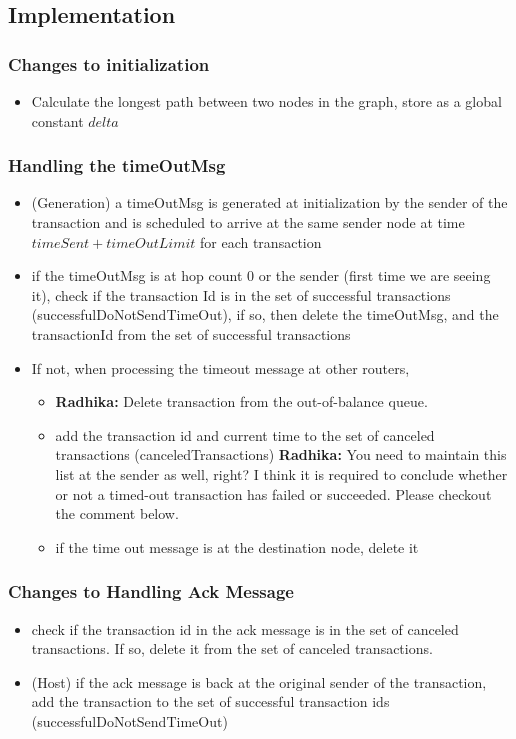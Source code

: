 \documentclass[a4paper]{article}
\newcommand{\radhika}[1]{{\color{red} \textbf{Radhika:} {#1}}}
\begin{document}
\subsection{Implementation}
\subsubsection{ Changes to initialization}
    \begin{itemize}
        \item Calculate the longest path between two nodes in the graph, store as a global constant $delta$
    \end{itemize}

\subsubsection{ Handling the timeOutMsg}
    \begin{itemize}
        \item (Generation) a timeOutMsg is generated at initialization by the sender of the transaction and is scheduled to arrive at the same sender node at time $timeSent + timeOutLimit$  for each transaction
        \item if the timeOutMsg is at hop count 0 or the sender (first time we are seeing it), check if the transaction Id is in the set of successful transactions (successfulDoNotSendTimeOut), if so, then delete the timeOutMsg, and the transactionId from the set of successful transactions
        \item If not, when processing the timeout message at other routers, 
        \begin{itemize}
            \item \radhika{Delete transaction from the out-of-balance queue.}
            \item add the transaction id and current time to the set of canceled transactions (canceledTransactions)
            \radhika{You need to maintain this list at the sender as well, right? I think it is required to conclude whether or not a timed-out transaction has failed or succeeded. Please checkout the comment below.} 
            \item if the time out message is at the destination node, delete it
        \end{itemize}
    \end{itemize}
\subsubsection{ Changes to Handling Ack Message}
    \begin{itemize}
        \item check if the transaction id in the ack message is in the set of canceled transactions. If so, delete it from the set of canceled transactions.
        \item (Host) if the ack message is back at the original sender of the transaction, add the transaction to the set of successful transaction ids (successfulDoNotSendTimeOut)

    \end{itemize}
\end{document}
